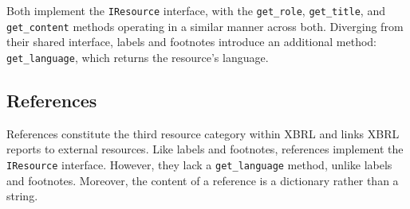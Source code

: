 Both implement the \texttt{IResource} interface,
with the \texttt{get\_role}, \texttt{get\_title}, and \texttt{get\_content} methods operating in a similar manner across both.
Diverging from their shared interface, labels and footnotes introduce an additional method: \texttt{get\_language},
which returns the resource's language.

\subsection{References}


References constitute the third resource category within XBRL
and links XBRL reports to external resources.
Like labels and footnotes, references implement the \texttt{IResource} interface.
However, they lack a \texttt{get\_language} method, unlike labels and footnotes.
Moreover, the content of a reference is a dictionary rather than a string.
